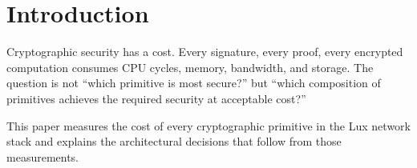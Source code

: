 \section{Introduction}


Cryptographic security has a cost. Every signature, every proof, every encrypted computation consumes CPU cycles, memory, bandwidth, and storage. The question is not ``which primitive is most secure?'' but ``which composition of primitives achieves the required security at acceptable cost?''

This paper measures the cost of every cryptographic primitive in the Lux network stack and explains the architectural decisions that follow from those measurements.

